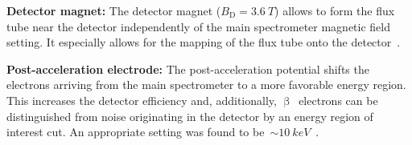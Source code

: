 {\par \textbf{Detector magnet:} The detector magnet ($B_\mathrm{D}=\SI{3.6}{T}$) allows to form the flux tube near the detector independently of the main spectrometer magnetic field setting. It especially allows for the mapping of the flux tube onto the detector~\cite{Amsbaugh2015}.}

{\par \textbf{Post-acceleration electrode:} The post-acceleration potential shifts the electrons arriving from the main spectrometer to a more favorable energy region. This increases the detector efficiency and, additionally, $\upbeta$~electrons can be distinguished from noise originating in the detector by an energy region of interest cut. An appropriate setting was found to be~$\sim\SI{10}{keV}$~\cite{Amsbaugh2015}.}